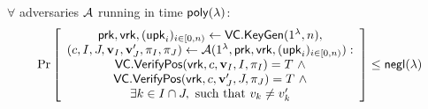 \begin{definition}
    \label{def:svc:position-binding-security}
    $\forall$ adversaries $\mathcal{A}$ running in time $\mathsf{poly}(\lambda)$:
    \begin{align*}
    \Pr \left[ \begin{array}{c}
    \mathsf{prk},\mathsf{vrk},(\mathsf{upk}_i)_{i\in[0,n)} \leftarrow \mathsf{VC}.\mathsf{KeyGen}(1^\lambda, n), \\
    (c,I,J,\bm{\mathrm{v}}_I,\bm{\mathrm{v}}'_J, \pi_I,\pi_J) \leftarrow\mathcal{A}(1^\lambda, \mathsf{prk},\mathsf{vrk},(\mathsf{upk}_i)_{i\in[0,n)}): \\
    \mathsf{VC}.\mathsf{VerifyPos}(\mathsf{vrk}, c, \bm{\mathrm{v}}_I, I, \pi_I) = T\ \wedge \\
    \mathsf{VC}.\mathsf{VerifyPos}(\mathsf{vrk}, c, \bm{\mathrm{v}}'_J, J, \pi_J) = T\ \wedge \\
    \exists k \in I\cap J,\ \text{such that}\ v_k \ne v'_k
    \end{array} \right] \le \mathsf{negl}(\lambda)
    \end{align*}
\end{definition}

